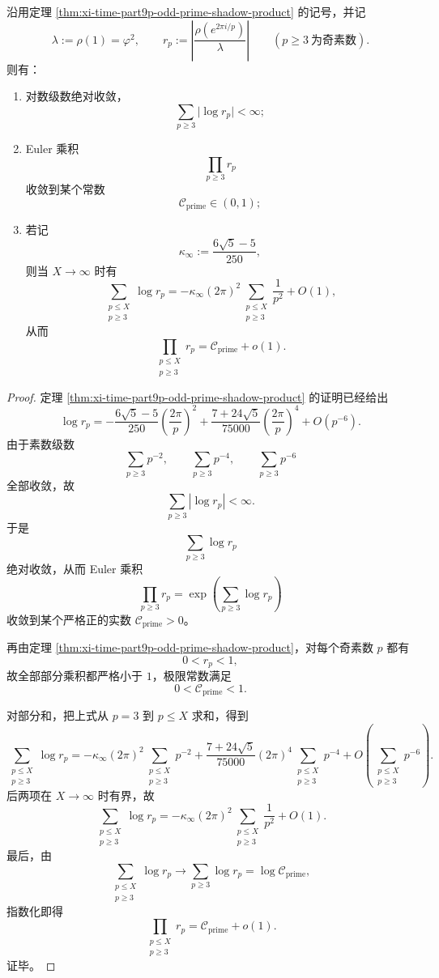 \begin{theorem}\label{thm:xi-time-part62df-odd-prime-twist-euler-positive-limit}
沿用定理 \ref{thm:xi-time-part9p-odd-prime-shadow-product} 的记号，并记
\[
\lambda:=\rho(1)=\varphi^2,
\qquad
r_p:=\left|\frac{\rho(e^{2\pi i/p})}{\lambda}\right|
\qquad (p\ge 3\ \text{为奇素数}).
\]
则有：
\begin{enumerate}
  \item 对数级数绝对收敛，
  \[
  \sum_{p\ge 3}\bigl|\log r_p\bigr|<\infty;
  \]
  \item Euler 乘积
  \[
  \prod_{p\ge 3}r_p
  \]
  收敛到某个常数
  \[
  \mathcal C_{\mathrm{prime}}\in(0,1);
  \]
  \item 若记
  \[
  \kappa_\infty:=\frac{6\sqrt5-5}{250},
  \]
  则当 \(X\to\infty\) 时有
  \[
  \sum_{\substack{p\le X\\ p\ge 3}}\log r_p
  =
  -\kappa_\infty(2\pi)^2
  \sum_{\substack{p\le X\\ p\ge 3}}\frac{1}{p^2}
  +O(1),
  \]
  从而
  \[
  \prod_{\substack{p\le X\\ p\ge 3}}r_p
  =
  \mathcal C_{\mathrm{prime}}+o(1).
  \]
\end{enumerate}
\end{theorem}
\begin{proof}
定理 \ref{thm:xi-time-part9p-odd-prime-shadow-product} 的证明已经给出
\[
\log r_p
=
-\frac{6\sqrt5-5}{250}\left(\frac{2\pi}{p}\right)^2
+\frac{7+24\sqrt5}{75000}\left(\frac{2\pi}{p}\right)^4
+O(p^{-6}).
\]
由于素数级数
\[
\sum_{p\ge 3}p^{-2},
\qquad
\sum_{p\ge 3}p^{-4},
\qquad
\sum_{p\ge 3}p^{-6}
\]
全部收敛，故
\[
\sum_{p\ge 3}|\log r_p|<\infty.
\]
于是
\[
\sum_{p\ge 3}\log r_p
\]
绝对收敛，从而 Euler 乘积
\[
\prod_{p\ge 3}r_p
=
\exp\!\left(\sum_{p\ge 3}\log r_p\right)
\]
收敛到某个严格正的实数 \(\mathcal C_{\mathrm{prime}}>0\)。

再由定理 \ref{thm:xi-time-part9p-odd-prime-shadow-product}，对每个奇素数 \(p\) 都有
\[
0<r_p<1,
\]
故全部部分乘积都严格小于 \(1\)，极限常数满足
\[
0<\mathcal C_{\mathrm{prime}}<1.
\]

对部分和，把上式从 \(p=3\) 到 \(p\le X\) 求和，得到
\[
\sum_{\substack{p\le X\\ p\ge 3}}\log r_p
=
-\kappa_\infty(2\pi)^2
\sum_{\substack{p\le X\\ p\ge 3}}p^{-2}
+\frac{7+24\sqrt5}{75000}(2\pi)^4
\sum_{\substack{p\le X\\ p\ge 3}}p^{-4}
+O\!\left(\sum_{\substack{p\le X\\ p\ge 3}}p^{-6}\right).
\]
后两项在 \(X\to\infty\) 时有界，故
\[
\sum_{\substack{p\le X\\ p\ge 3}}\log r_p
=
-\kappa_\infty(2\pi)^2
\sum_{\substack{p\le X\\ p\ge 3}}\frac{1}{p^2}
+O(1).
\]
最后，由
\[
\sum_{\substack{p\le X\\ p\ge 3}}\log r_p
\longrightarrow
\sum_{p\ge 3}\log r_p
=
\log \mathcal C_{\mathrm{prime}},
\]
指数化即得
\[
\prod_{\substack{p\le X\\ p\ge 3}}r_p
=
\mathcal C_{\mathrm{prime}}+o(1).
\]
证毕。
\end{proof}

